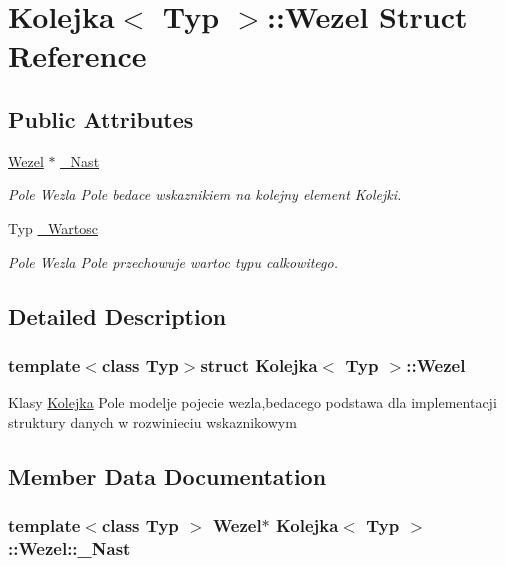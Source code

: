 \hypertarget{struct_kolejka_1_1_wezel}{\section{Kolejka$<$ Typ $>$\-:\-:Wezel Struct Reference}
\label{struct_kolejka_1_1_wezel}
}
\subsection*{Public Attributes}
\begin{DoxyCompactItemize}
\item 
\hyperlink{struct_kolejka_1_1_wezel}{Wezel} $\ast$ \hyperlink{struct_kolejka_1_1_wezel_aadaafaa4a81cf0ddb3fe506688f93c03}{\-\_\-\-Nast}
\begin{DoxyCompactList}\small\item\em Pole Wezla Pole bedace wskaznikiem na kolejny element Kolejki. \end{DoxyCompactList}\item 
Typ \hyperlink{struct_kolejka_1_1_wezel_afb3e7fb216cacf18bef1c69c3e38b7f2}{\-\_\-\-Wartosc}
\begin{DoxyCompactList}\small\item\em Pole Wezla Pole przechowuje wartoc typu calkowitego. \end{DoxyCompactList}\end{DoxyCompactItemize}


\subsection{Detailed Description}
\subsubsection*{template$<$class Typ$>$struct Kolejka$<$ Typ $>$\-::\-Wezel}

Klasy \hyperlink{class_kolejka}{Kolejka} Pole modelje pojecie wezla,bedacego podstawa dla implementacji struktury danych w rozwinieciu wskaznikowym 

\subsection{Member Data Documentation}
\hypertarget{struct_kolejka_1_1_wezel_aadaafaa4a81cf0ddb3fe506688f93c03}{
\subsubsection[{\-\_\-\-Nast}]{\setlength{\rightskip}{0pt plus 5cm}template$<$class Typ $>$ {\bf Wezel}$\ast$ {\bf Kolejka}$<$ Typ $>$\-::Wezel\-::\-\_\-\-Nast}}\label{struct_kolejka_1_1_wezel_aadaafaa4a81cf0ddb3fe506688f93c03}


